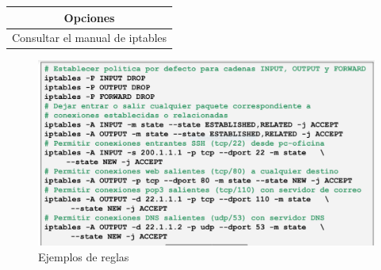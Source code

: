     \begin{table}[H]\centering\begin{tabular}{|c|}\hline
    \rowcolor[HTML]{000000}  {\color[HTML]{FFFFFF} \textbf{Opciones}} \\ \hline
    Consultar el manual de iptables \\ \hline
    \end{tabular}\end{table}
    
    \begin{figure}[H]
        \centering
        \includegraphics[width=\textwidth]{img/EjemplosReglas.PNG}
        \caption{Ejemplos de reglas}
    \end{figure}
    
